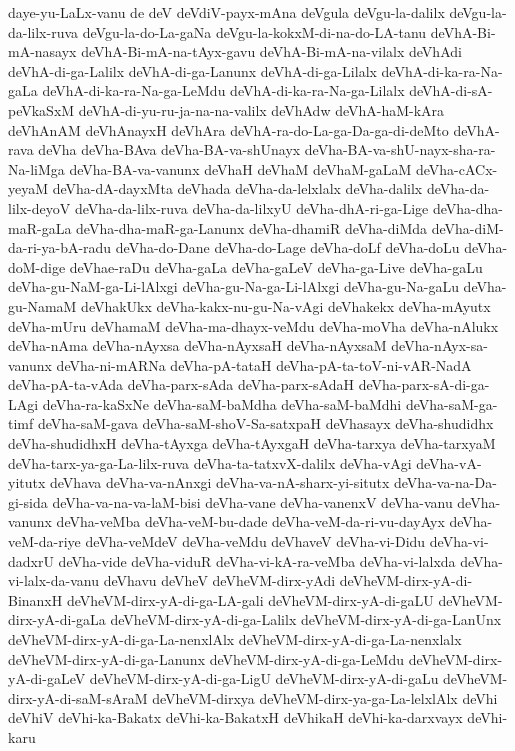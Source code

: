 {daye-yu-LaLx-vanu
de
deV
deVdiV-payx-mAna
deVgula
deVgu-la-dalilx
deVgu-la-da-lilx-ruva
deVgu-la-do-La-gaNa
deVgu-la-kokxM-di-na-do-LA-tanu
deVhA-Bi-mA-nasayx
deVhA-Bi-mA-na-tAyx-gavu
deVhA-Bi-mA-na-vilalx
deVhAdi
deVhA-di-ga-Lalilx
deVhA-di-ga-Lanunx
deVhA-di-ga-Lilalx
deVhA-di-ka-ra-Na-gaLa
deVhA-di-ka-ra-Na-ga-LeMdu
deVhA-di-ka-ra-Na-ga-Lilalx
deVhA-di-sA-peVkaSxM
deVhA-di-yu-ru-ja-na-na-valilx
deVhAdw
deVhA-haM-kAra
deVhAnAM
deVhAnayxH
deVhAra
deVhA-ra-do-La-ga-Da-ga-di-deMto
deVhA-rava
deVha
deVha-BAva
deVha-BA-va-shUnayx
deVha-BA-va-shU-nayx-sha-ra-Na-liMga
deVha-BA-va-vanunx
deVhaH
deVhaM
deVhaM-gaLaM
deVha-cACx-yeyaM
deVha-dA-dayxMta
deVhada
deVha-da-lelxlalx
deVha-dalilx
deVha-da-lilx-deyoV
deVha-da-lilx-ruva
deVha-da-lilxyU
deVha-dhA-ri-ga-Lige
deVha-dha-maR-gaLa
deVha-dha-maR-ga-Lanunx
deVha-dhamiR
deVha-diMda
deVha-diM-da-ri-ya-bA-radu
deVha-do-Dane
deVha-do-Lage
deVha-doLf
deVha-doLu
deVha-doM-dige
deVhae-raDu
deVha-gaLa
deVha-gaLeV
deVha-ga-Live
deVha-gaLu
deVha-gu-NaM-ga-Li-lAlxgi
deVha-gu-Na-ga-Li-lAlxgi
deVha-gu-Na-gaLu
deVha-gu-NamaM
deVhakUkx
deVha-kakx-nu-gu-Na-vAgi
deVhakekx
deVha-mAyutx
deVha-mUru
deVhamaM
deVha-ma-dhayx-veMdu
deVha-moVha
deVha-nAlukx
deVha-nAma
deVha-nAyxsa
deVha-nAyxsaH
deVha-nAyxsaM
deVha-nAyx-sa-vanunx
deVha-ni-mARNa
deVha-pA-tataH
deVha-pA-ta-toV-ni-vAR-NadA
deVha-pA-ta-vAda
deVha-parx-sAda
deVha-parx-sAdaH
deVha-parx-sA-di-ga-LAgi
deVha-ra-kaSxNe
deVha-saM-baMdha
deVha-saM-baMdhi
deVha-saM-ga-timf
deVha-saM-gava
deVha-saM-shoV-Sa-satxpaH
deVhasayx
deVha-shudidhx
deVha-shudidhxH
deVha-tAyxga
deVha-tAyxgaH
deVha-tarxya
deVha-tarxyaM
deVha-tarx-ya-ga-La-lilx-ruva
deVha-ta-tatxvX-dalilx
deVha-vAgi
deVha-vA-yitutx
deVhava
deVha-va-nAnxgi
deVha-va-nA-sharx-yi-situtx
deVha-va-na-Da-gi-sida
deVha-va-na-va-laM-bisi
deVha-vane
deVha-vanenxV
deVha-vanu
deVha-vanunx
deVha-veMba
deVha-veM-bu-dade
deVha-veM-da-ri-vu-dayAyx
deVha-veM-da-riye
deVha-veMdeV
deVha-veMdu
deVhaveV
deVha-vi-Didu
deVha-vi-dadxrU
deVha-vide
deVha-viduR
deVha-vi-kA-ra-veMba
deVha-vi-lalxda
deVha-vi-lalx-da-vanu
deVhavu
deVheV
deVheVM-dirx-yAdi
deVheVM-dirx-yA-di-BinanxH
deVheVM-dirx-yA-di-ga-LA-gali
deVheVM-dirx-yA-di-gaLU
deVheVM-dirx-yA-di-gaLa
deVheVM-dirx-yA-di-ga-Lalilx
deVheVM-dirx-yA-di-ga-LanUnx
deVheVM-dirx-yA-di-ga-La-nenxlAlx
deVheVM-dirx-yA-di-ga-La-nenxlalx
deVheVM-dirx-yA-di-ga-Lanunx
deVheVM-dirx-yA-di-ga-LeMdu
deVheVM-dirx-yA-di-gaLeV
deVheVM-dirx-yA-di-ga-LigU
deVheVM-dirx-yA-di-gaLu
deVheVM-dirx-yA-di-saM-sAraM
deVheVM-dirxya
deVheVM-dirx-ya-ga-La-lelxlAlx
deVhi
deVhiV
deVhi-ka-Bakatx
deVhi-ka-BakatxH
deVhikaH
deVhi-ka-darxvayx
deVhi-karu
}
